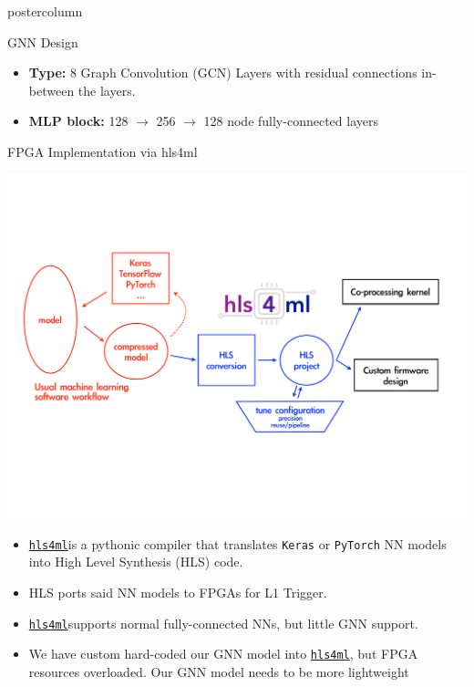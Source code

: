 \documentclass[final,hyperref={pdfpagelabels=false}]{beamer}
\newcommand{\hlsfml}{{\href{https://github.com/hls-fpga-machine-learning/hls4ml}{\texttt{hls4ml}}}}
\begin{document}
\begin{frame}
\begin{columns}
\begin{column}{.49\textwidth}
\begin{beamercolorbox}[center,wd=\textwidth]{postercolumn}
\begin{minipage}[T]{.95\textwidth}
{\begin{block}{GNN Design}
                \begin{itemize}
                \item \textbf{Type:} 8 Graph Convolution (GCN) Layers with residual connections in-between the layers.
                \item \textbf{MLP block:} 128 $\rightarrow$ 256 $\rightarrow$ 128 node fully-connected layers
                \end{itemize}
              \end{block}
            
            \begin{block}{FPGA Implementation via hls4ml}
             \begin{center}
                \includegraphics[width=0.8\linewidth]{flow-hls4ml.pdf}
              \end{center}
              \begin{itemize}
              \item \hlsfml\;is a pythonic compiler that translates  {\tt Keras} or {\tt PyTorch} NN models into High Level Synthesis (HLS) code.
              \item HLS ports said NN models to FPGAs for L1 Trigger.
               \item \hlsfml\;supports normal fully-connected NNs, but little GNN support.
                \item We have custom hard-coded our GNN model into \hlsfml, but FPGA resources overloaded. Our GNN model needs to be more lightweight
              \end{itemize}
             

\end{block}}
\end{minipage}
\end{beamercolorbox}
\end{column}
\end{columns}
\end{frame}
\end{document}
